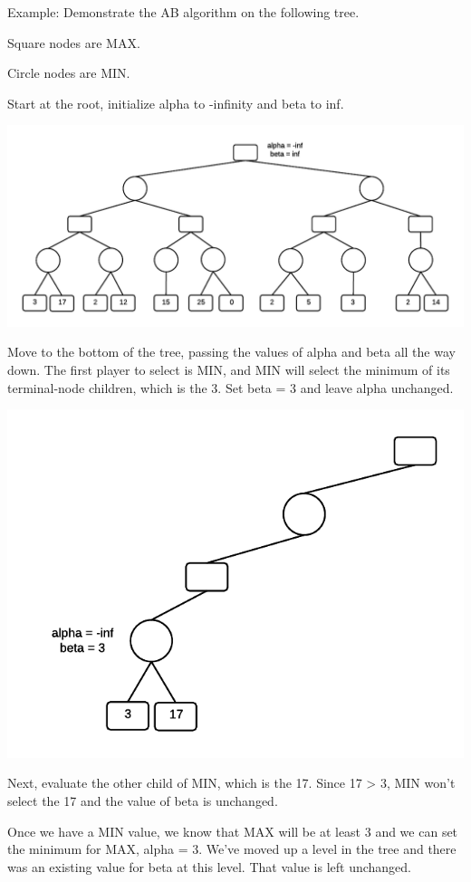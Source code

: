 \documentclass[12pt]{article}
\makeatletter
\def\maxwidth{\ifdim\Gin@nat@width>\linewidth\linewidth
    \else\Gin@nat@width\fi}
\let\Oldincludegraphics\includegraphics
\renewcommand{\includegraphics}[1]{\Oldincludegraphics[width=.8\maxwidth]{#1}}
\makeatother
\begin{document}
    Example: Demonstrate the AB algorithm on the following tree.

Square nodes are MAX.

Circle nodes are MIN.

Start at the root, initialize alpha to -infinity and beta to inf.

\includegraphics{./img/ABExample1_Corrected.png}

Move to the bottom of the tree, passing the values of alpha and beta all
the way down. The first player to select is MIN, and MIN will select the
minimum of its terminal-node children, which is the 3. Set beta = 3 and
leave alpha unchanged.

\includegraphics{img/ABExample2.png}

Next, evaluate the other child of MIN, which is the 17. Since 17
\textgreater{} 3, MIN won't select the 17 and the value of beta is
unchanged.

Once we have a MIN value, we know that MAX will be at least 3 and we can
set the minimum for MAX, alpha = 3. We've moved up a level in the tree
and there was an existing value for beta at this level. That value is
left unchanged.
\end{document}
